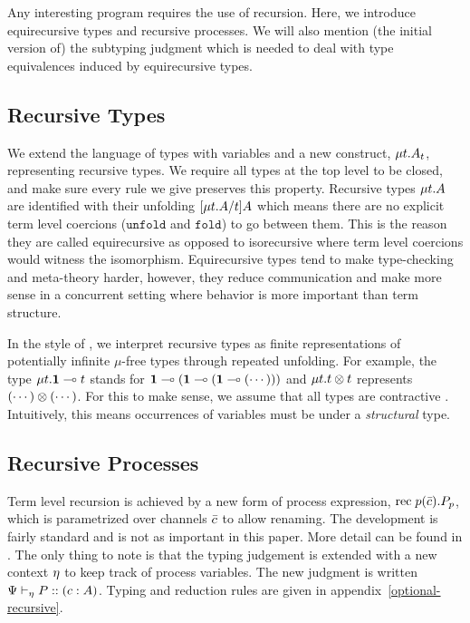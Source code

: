\documentclass[a4paper,USenglish]{lipics-v2016}
\begin{document}
Any interesting program requires the use of recursion. Here, we introduce equirecursive types and recursive processes. We will also mention (the initial version of) the subtyping judgment which is needed to deal with type equivalences induced by equirecursive types.


\subsection{Recursive Types}

We extend the language of types with variables and a new construct, $\mu{t} . {A_t}$, representing recursive types. We require all types at the top level to be closed, and make sure every rule we give preserves this property. Recursive types $\mu{t} . {A}$ are identified with their unfolding $\lbrack{\mu{t} . {A}}/{t}\rbrack{A}$ which means there are no explicit term level coercions ($\mathtt{unfold}$ and $\mathtt{fold}$) to go between them. This is the reason they are called equirecursive as opposed to isorecursive where term level coercions would witness the isomorphism. Equirecursive types tend to make type-checking and meta-theory harder, however, they reduce communication and make more sense in a concurrent setting where behavior is more important than term structure.

In the style of \cite{AmadioC91}, we interpret recursive types as finite representations of potentially infinite $\mu$-free types through repeated unfolding. For example, the type $\mu{t} . {\mathbf{1} \multimap t}$ stands for $\mathbf{1} \multimap (\mathbf{1} \multimap (\mathbf{1} \multimap (\cdots )))$ and $\mu{t} . {t \otimes t}$ represents $(\cdots) \otimes (\cdots)$. For this to make sense, we assume that all types are contractive \cite{StoneS2005, GayH05}. Intuitively, this means occurrences of variables must be under a \emph{structural} type.


\subsection{Recursive Processes}

Term level recursion is achieved by a new form of process expression, $\mathrm{rec}\; {p}(\bar{c}) . {P}_p$, which is parametrized over channels $\bar{c}$ to allow renaming. The development is fairly standard and is not as important in this paper. More detail can be found in \cite{ToninhoCP14}. The only thing to note is that the typing judgement is extended with a new context $\eta$ to keep track of process variables. The new judgment is written ${\Psi} \vdash_{\eta} P :: (c : A)$. Typing and reduction rules are given in appendix~\ref{optional-recursive}.
\end{document}

